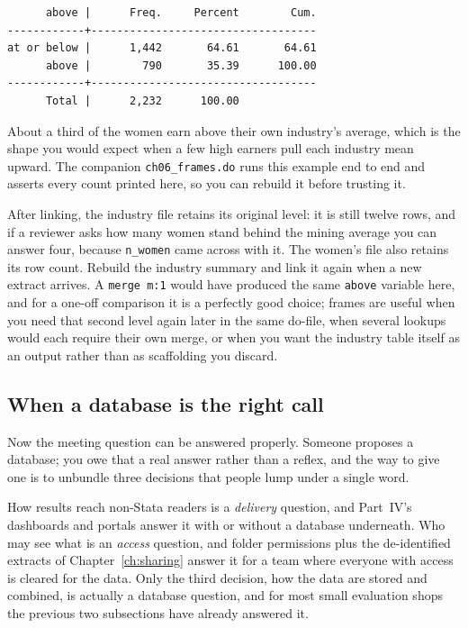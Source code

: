 \documentclass[
    a4paper,
    fontsize=10pt,
    twoside=true,
    numbers=noenddot,
]{kaobook}
\begin{document}
\par
{\footnotesize
\begin{verbatim}
      above |      Freq.     Percent        Cum.
------------+-----------------------------------
at or below |      1,442       64.61       64.61
      above |        790       35.39      100.00
------------+-----------------------------------
      Total |      2,232      100.00
\end{verbatim}
}
About a third of the women earn above their own industry's average, which is the shape you would expect when a few high earners pull each industry mean upward. The companion \texttt{ch06\_frames.do} runs this example end to end and asserts every count printed here, so you can rebuild it before trusting it.

After linking, the industry file retains its original level: it is still twelve rows, and if a reviewer asks how many women stand behind the mining average you can answer four, because \texttt{n\_women} came across with it. The women's file also retains its row count. Rebuild the industry summary and link it again when a new extract arrives. A \texttt{merge m:1} would have produced the same \texttt{above} variable here, and for a one-off comparison it is a perfectly good choice; frames are useful when you need that second level again later in the same do-file, when several lookups would each require their own merge, or when you want the industry table itself as an output rather than as scaffolding you discard.

\subsection{When a database is the right call}\label{sec:ch06-dbcase}
Now the meeting question can be answered properly. Someone proposes a database; you owe that a real answer rather than a reflex, and the way to give one is to unbundle three decisions that people lump under a single word.

How results reach non-Stata readers is a \emph{delivery} question, and Part~IV's dashboards and portals answer it with or without a database underneath. Who may see what is an \emph{access} question, and folder permissions plus the de-identified extracts of Chapter~\ref{ch:sharing} answer it for a team where everyone with access is cleared for the data. Only the third decision, how the data are stored and combined, is actually a database question, and for most small evaluation shops the previous two subsections have already answered it.
\end{document}
